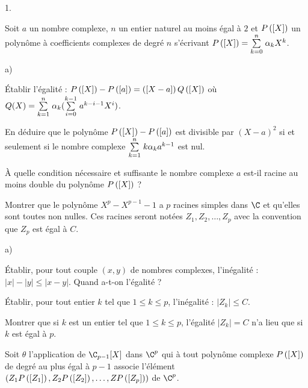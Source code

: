 \documentclass[11pt]{article}%
\begin{document}
\begin{noliste}{1.}
 \setlength{\itemsep}{4mm}
\item Soit $a$ un nombre complexe, $n$ un entier naturel au moins égal
à $2$
et $P\left(\left[ {X} \right]\right)$ un polynôme à coefficients complexes de degré
$n$ s'écrivant $P\left(\left[ {X} \right]\right) = {\textstyle\sum\limits_{k = 0}^{n}}\hspace{.1cm}\alpha_{k}X^{k}$.

\begin{noliste}{a)}
 \setlength{\itemsep}{2mm}
\item Établir l'égalité : $P\left(\left[ {X} \right]\right)-P\left(\left[ {a} \right]\right) =
\left(\left[ {X-a} \right]\right)Q\left(\left[ {X} \right]\right)$ où $Q(X) = {\textstyle\sum\limits_{k =
1}^{n}}\hspace{.1cm}\alpha_{k}({\textstyle\sum\limits_{i = 0}^{k-1}}\hspace{.1cm}a^{k-i-1}X^{i})$.

\item En déduire que le polynôme
$P\left(\left[ {X} \right]\right)-P\left(\left[ {a} \right]\right)$ est divisible par
$(X-a)^{2}$
si et seulement si le nombre complexe ${\textstyle\sum\limits_{k = 1}^{n}}\hspace{.1cm}k\alpha
_{k}a^{k-1}$ est nul.

\item À quelle condition nécessaire et suffisante le nombre complexe
$a$
est-il racine au moins double du polynôme $P\left(\left[ {X} \right]\right)$ ?
\end{noliste}

\item Montrer que le polynôme $X^{p}-X^{p-1}-1$ a $p$ racines simples
dans $\C$ et qu'elles sont toutes non nulles. Ces racines seront notées
$Z_{1},Z_{2},\dots,Z_{p}$ avec la convention que $Z_{p}$ est égal à
$C$.

\item 

\begin{noliste}{a)}
 \setlength{\itemsep}{2mm}
\item Établir, pour tout couple $(x,y)$ de nombres complexes,
l'inégalité : $\left| x\right| -\left| y\right| \leq \left|
x-y\right| $. Quand a-t-on l'égalité ?

\item Établir, pour tout entier $k$ tel que $1\leq k\leq p$,
l'inégalité : $\left| Z_{k}\right| \leq C$.

\item Montrer que si $k$ est un entier tel que $1\leq k\leq p$,
l'égalité $\left| Z_{k}\right| = C$ n'a lieu que si $k$ est égal à $p$.
\end{noliste}

\item Soit $\theta $ l'application de $\C_{p-1}[X]$ dans $\C^{p}$ qui à
tout polynôme complexe $P\left(\left[ {X} \right]\right)$ de degré au plus égal à
$p-1$
associe l'élément
$(Z_{1}P\left(\left[ {Z_{1}} \right]\right),Z_{2}P\left(\left[ {Z_{2}} \right]\right),\dots,Z_{
}P\left(\left[ {Z_{p}} \right]\right))$ de $\C^{p}$.


\end{noliste}
\end{document}
